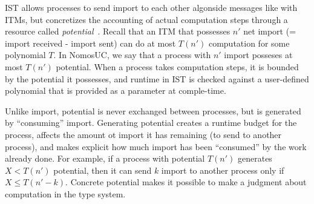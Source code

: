 IST allows processes to send import to each other algonside messages like with ITMs, but concretizes the accounting of actual computation steps through a resource called \emph{potential}~\cite{das2018work,dasnomos}.
Recall that an ITM that possesses $n'$ net import (= import received - import sent) can do at most $T(n')$ computation for some polynomial $T$.
In NomosUC, we say that a process with $n'$ import posseses at most $T(n')$ potential.
When a process takes computation steps, it is bounded by the potential it possesses, and runtime in IST is checked against a user-defined polynomial that is provided as a parameter at comple-time.

Unlike import, potential is never exchanged between processes, but is generated by ``consuming'' import.
Generating potential creates a runtime budget for the process, affects the amount ot import it has remaining (to send to another process), and makes explicit how much import has been ``consumed'' by the work already done.
For example, if a process with potential $T(n')$ generates $X < T(n')$ potential, then it can send $k$ import to another process only if $X \leq T(n'-k)$.
Concrete potential makes it possible to make a judgment about computation in the type system.

